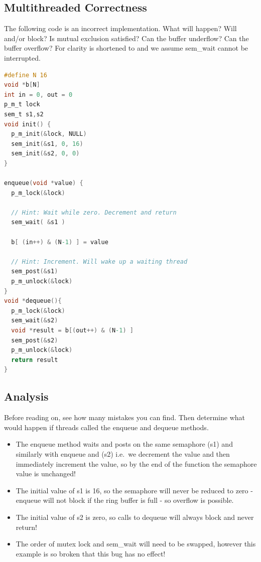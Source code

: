 \subsection{Multithreaded Correctness}

The following code is an incorrect implementation.
What will happen?
Will  and/or  block?
Is mutual exclusion satisfied?
Can the buffer underflow?
Can the buffer overflow?
For clarity  is shortened to  and we assume sem\_wait cannot be interrupted.

\begin{lstlisting}[language=C]
#define N 16
void *b[N]
int in = 0, out = 0
p_m_t lock
sem_t s1,s2
void init() {
  p_m_init(&lock, NULL)
  sem_init(&s1, 0, 16)
  sem_init(&s2, 0, 0)
}

enqueue(void *value) {
  p_m_lock(&lock)

  // Hint: Wait while zero. Decrement and return
  sem_wait( &s1 )

  b[ (in++) & (N-1) ] = value

  // Hint: Increment. Will wake up a waiting thread
  sem_post(&s1)
  p_m_unlock(&lock)
}
void *dequeue(){
  p_m_lock(&lock)
  sem_wait(&s2)
  void *result = b[(out++) & (N-1) ]
  sem_post(&s2)
  p_m_unlock(&lock)
  return result
}
\end{lstlisting}

\subsection{Analysis}

Before reading on, see how many mistakes you can find. Then determine what would happen if threads called the enqueue and dequeue methods.

\begin{itemize}
\tightlist
\item
  The enqueue method waits and posts on the same semaphore (s1) and similarly with enqueue and (s2) i.e.~we decrement the value and then immediately increment the value, so by the end of the function the semaphore value is unchanged!
\item
  The initial value of s1 is 16, so the semaphore will never be reduced to zero - enqueue will not block if the ring buffer is full - so overflow is possible.
\item
  The initial value of s2 is zero, so calls to dequeue will always block and never return!
\item
  The order of mutex lock and sem\_wait will need to be swapped, however this example is so broken that this bug has no effect!
\end{itemize}

